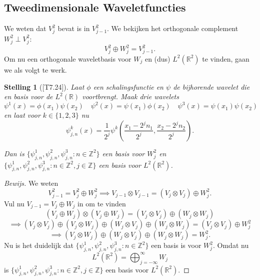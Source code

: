 \documentclass[11pt]{report}
\theoremstyle{plain}
\newtheorem{stelling}{Stelling}
\theoremstyle{definition}
\theoremstyle{remark}
\newcommand{\R}{\mathbb{R}}
\newcommand{\Z}{\mathbb{Z}}
\begin{document}
\subsection{Tweedimensionale Waveletfuncties} We weten dat $V_j^2$ bevat is in $V_{j-1}^2$. We bekijken het orthogonale complement $W_j^2 \perp V_j^2$:
\[
	V_j^2 \oplus W_j^2 = V_{j-1}^2.
\]
Om nu een orthogonale waveletbasis voor $W_j$ en (dus) $L^2(\R^2)$ te vinden, gaan we als volgt te werk.
\begin{stelling}[{\cite{mallat}[T7.24]}]
Laat $\phi$ een schalingsfunctie en $\psi$ de bijhorende wavelet die en basis voor de $L^2(\R)$ voortbrengt. Maak drie wavelets
\[
	\psi^1(x) = \phi(x_1)\psi(x_2) \quad \psi^2(x) = \psi(x_1) \phi(x_2) \quad \psi^3(x) = \psi(x_1)\psi(x_2)
\]
en laat voor $k \in \{1,2,3\}$ nu
\[
	\psi^k_{j,n}(x) = \frac{1}{2^j} \psi^k\left( \frac{x_1 - 2^j n_1}{2^j}, \frac{x_2 - 2^j n_2}{2^j} \right).
\]

Dan is $\{ \psi^1_{j,n}, \psi^2_{j,n}, \psi^3_{j,n}: n \in \Z^2 \}$ een basis voor $W_j^2$ en $\{ \psi^1_{j,n}, \psi^2_{j,n}, \psi^3_{j,n}: n \in \Z^2, j \in \Z \}$ een basis voor $L^2(\R^2)$.
\end{stelling}
\begin{proof}[Bewijs]
We weten
\[
	V_{j-1}^2 = V_j^2 \oplus W_j^2 \implies V_{j-1} \otimes V_{j-1} = ( V_j \otimes V_j ) \oplus W_j^2.
\]
Vul nu $V_{j-1} = V_j \oplus W_j$ in om te vinden
\[
	( V_j \oplus W_j ) \otimes (V_j \oplus W_j ) = (V_j \otimes V_j) \oplus (W_j \otimes W_j) 
\]
\[
	\implies (V_j \otimes V_j) \oplus (V_j \otimes W_j) \oplus (W_j \otimes V_j) \oplus (W_j \otimes W_j) = (V_j \otimes V_j) \oplus W_j^2
\]
\[
	\implies (V_j \otimes W_j) \oplus (W_j \otimes V_j) \oplus (W_j \otimes W_j) = W_j^2.
\]
Nu is het duidelijk dat $\{ \psi^1_{j,n}, \psi^2_{j,n}, \psi^3_{j,n}: n \in \Z^2 \}$ een basis is voor $W_j^2$. Omdat nu
\[
	L^2(\R^2) = \bigoplus_{j=-\infty}^\infty W_j
\]
is $\{ \psi^1_{j,n}, \psi^2_{j,n}, \psi^3_{j,n}: n \in \Z^2, j \in \Z \}$ een basis voor $L^2(\R^2)$.
\end{proof}
\end{document}

